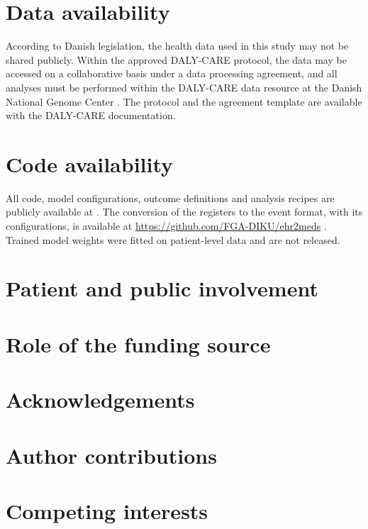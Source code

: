 \section*{Data availability}
According to Danish legislation, the health data used in this study may not be
shared publicly. Within the approved DALY-CARE protocol, the data may be
accessed on a collaborative basis under a data processing agreement, and all
analyses must be performed within the DALY-CARE data resource at the Danish
National Genome Center \citep{brieghel2025dalycare}. The protocol and the
agreement template are available with the DALY-CARE documentation.
\section*{Code availability}
All code, model configurations, outcome definitions and analysis recipes are
publicly available at . The
conversion of the registers to the event format, with its configurations, is
available at \url{https://github.com/FGA-DIKU/ehr2meds} .
Trained model weights were fitted on patient-level data and are not released.
\section*{Patient and public involvement}
\section*{Role of the funding source}
\section*{Acknowledgements}
\section*{Author contributions}
\section*{Competing interests}
